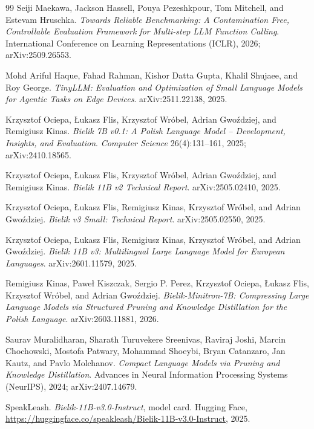 \documentclass[11pt]{article}
\begin{document}
\begin{thebibliography}{99}
Seiji Maekawa, Jackson Hassell, Pouya Pezeshkpour, Tom Mitchell, and Estevam Hruschka.
\newblock \emph{Towards Reliable Benchmarking: A Contamination Free, Controllable Evaluation Framework for Multi-step LLM Function Calling}.
\newblock International Conference on Learning Representations (ICLR), 2026; arXiv:2509.26553.

Mohd Ariful Haque, Fahad Rahman, Kishor Datta Gupta, Khalil Shujaee, and Roy George.
\newblock \emph{TinyLLM: Evaluation and Optimization of Small Language Models for Agentic Tasks on Edge Devices}.
\newblock arXiv:2511.22138, 2025.

Krzysztof Ociepa, Łukasz Flis, Krzysztof Wróbel, Adrian Gwoździej, and Remigiusz Kinas.
\newblock \emph{Bielik 7B v0.1: A Polish Language Model -- Development, Insights, and Evaluation}.
\newblock \emph{Computer Science} 26(4):131--161, 2025; arXiv:2410.18565.

Krzysztof Ociepa, Łukasz Flis, Krzysztof Wróbel, Adrian Gwoździej, and Remigiusz Kinas.
\newblock \emph{Bielik 11B v2 Technical Report}.
\newblock arXiv:2505.02410, 2025.

Krzysztof Ociepa, Łukasz Flis, Remigiusz Kinas, Krzysztof Wróbel, and Adrian Gwoździej.
\newblock \emph{Bielik v3 Small: Technical Report}.
\newblock arXiv:2505.02550, 2025.

Krzysztof Ociepa, Łukasz Flis, Remigiusz Kinas, Krzysztof Wróbel, and Adrian Gwoździej.
\newblock \emph{Bielik 11B v3: Multilingual Large Language Model for European Languages}.
\newblock arXiv:2601.11579, 2025.

Remigiusz Kinas, Paweł Kiszczak, Sergio P. Perez, Krzysztof Ociepa, Łukasz Flis, Krzysztof Wróbel, and Adrian Gwoździej.
\newblock \emph{Bielik-Minitron-7B: Compressing Large Language Models via Structured Pruning and Knowledge Distillation for the Polish Language}.
\newblock arXiv:2603.11881, 2026.

Saurav Muralidharan, Sharath Turuvekere Sreenivas, Raviraj Joshi, Marcin Chochowski, Mostofa Patwary, Mohammad Shoeybi, Bryan Catanzaro, Jan Kautz, and Pavlo Molchanov.
\newblock \emph{Compact Language Models via Pruning and Knowledge Distillation}.
\newblock Advances in Neural Information Processing Systems (NeurIPS), 2024; arXiv:2407.14679.

SpeakLeash.
\newblock \emph{Bielik-11B-v3.0-Instruct}, model card.
\newblock Hugging Face, \url{https://huggingface.co/speakleash/Bielik-11B-v3.0-Instruct}, 2025.


\end{thebibliography}
\end{document}
